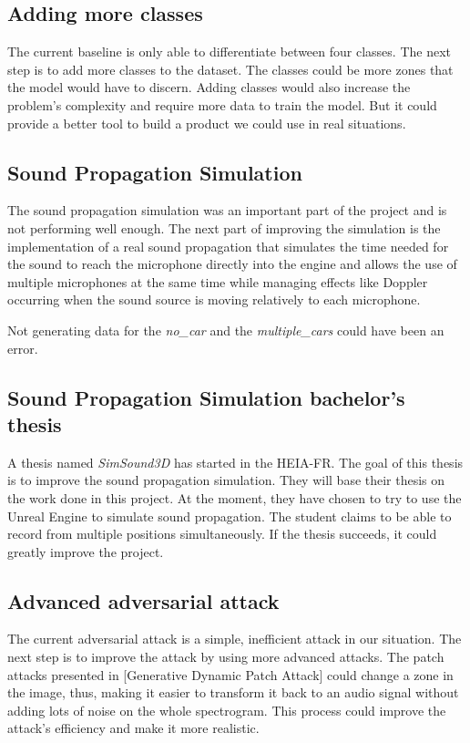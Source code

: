 \subsection{Adding more classes}

The current baseline is only able to differentiate between four classes. The next step is to add more classes to the dataset. The classes could be more zones that the model would have to discern. Adding classes would also increase the problem's complexity and require more data to train the model. But it could provide a better tool to build a product we could use in real situations.

\subsection{Sound Propagation Simulation}

The sound propagation simulation was an important part of the project and is not performing well enough. The next part of improving the simulation is the implementation of a real sound propagation that simulates the time needed for the sound to reach the microphone directly into the engine and allows the use of multiple microphones at the same time while managing effects like Doppler occurring when the sound source is moving relatively to each microphone.

Not generating data for the \textit{no\_car} and the \textit{multiple\_cars} could have been an error. 

\subsection{Sound Propagation Simulation bachelor's thesis}

A thesis named \textit{SimSound3D} has started in the HEIA-FR. The goal of this thesis is to improve the sound propagation simulation. They will base their thesis on the work done in this project. At the moment, they have chosen to try to use the Unreal Engine to simulate sound propagation. The student claims to be able to record from multiple positions simultaneously. If the thesis succeeds, it could greatly improve the project.

\subsection{Advanced adversarial attack}

The current adversarial attack is a simple, inefficient attack in our situation. The next step is to improve the attack by using more advanced attacks. The patch attacks presented in [Generative Dynamic Patch Attack]\cite{li2021generative} could change a zone in the image, thus, making it easier to transform it back to an audio signal without adding lots of noise on the whole spectrogram. This process could improve the attack's efficiency and make it more realistic.

